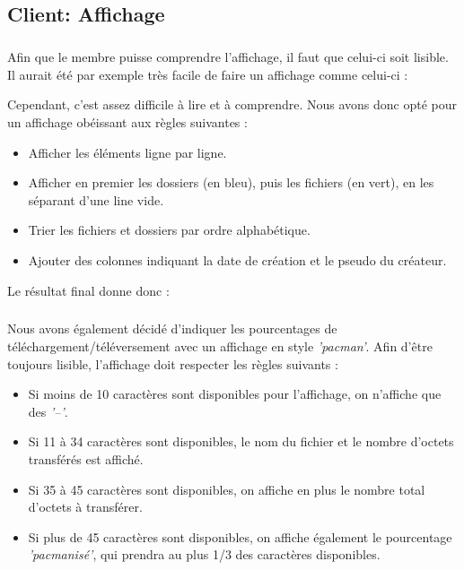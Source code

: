 \documentclass[12pt,a4paper,twoside]{article}
\begin{document}
		\subsection{Client: Affichage} %
			\subparagraph*{}
				Afin que le membre puisse comprendre l'affichage, il faut que celui-ci soit lisible. Il aurait été par exemple très facile de faire un affichage comme celui-ci :
				
				Cependant, c'est assez difficile à lire et à comprendre. Nous avons donc opté pour un affichage obéissant aux règles suivantes :
				\begin{itemize}
					\item{} Afficher les éléments ligne par ligne.
					\item{} Afficher en premier les dossiers (en bleu), puis les fichiers (en vert), en les séparant d'une line vide.
					\item{} Trier les fichiers et dossiers par ordre alphabétique.
					\item{} Ajouter des colonnes indiquant la date de création et le pseudo du créateur.
				\end{itemize}
				Le résultat final donne donc :
				
			\subparagraph*{}
				Nous avons également décidé d'indiquer les pourcentages de téléchargement/téléversement avec un affichage en style \textit{'pacman'}. Afin d'être toujours lisible, l'affichage doit respecter les règles suivants :
				\begin{itemize}
					\item{} Si moins de 10 caractères sont disponibles pour l'affichage, on n'affiche que des \textit{'–'}.
					\item{} Si 11 à 34 caractères sont disponibles, le nom du fichier et le nombre d'octets transférés est affiché.
					\item{} Si 35 à 45 caractères sont disponibles, on affiche en plus le nombre total d'octets à transférer.
					\item{} Si plus de 45 caractères sont disponibles, on affiche également le pourcentage \textit{'pacmanisé'}, qui prendra au plus 1/3 des caractères disponibles.
				 \end{itemize}
\end{document}
